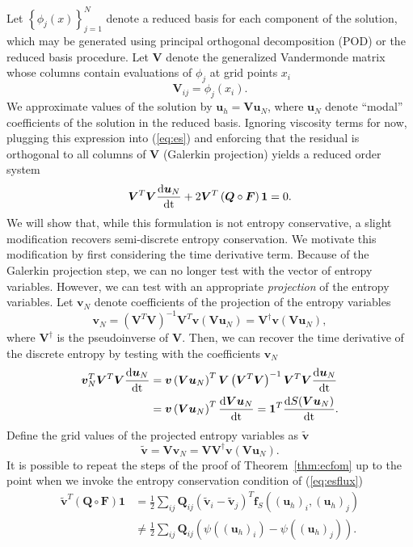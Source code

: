 \documentclass[review]{siamart171218}
\theoremstyle{assumption}
\renewcommand{\tilde}{\widetilde}
\newcommand{\td}[2]{\frac{{\rm d}#1}{{\rm d}{\rm #2}}}
\newcommand{\LRp}[1]{\left( #1 \right)}
\newcommand{\LRc}[1]{\left\{ #1 \right\}}
\begin{document}
Let $\LRc{{\phi}_j(x)}_{j=1}^{N}$ denote a reduced basis for each component of the solution, which may be generated using principal orthogonal decomposition (POD) or the reduced basis procedure.  Let $\bm{V}$ denote the generalized Vandermonde matrix whose columns contain evaluations of $\phi_j$ at grid points $x_i$
\[
\bm{V}_{ij} = {\phi}_j(x_i).
\]
We approximate values of the solution by $\bm{u}_h = \bm{V}\bm{u}_N$, where $\bm{u}_N$ denote ``modal'' coefficients  of the solution in the reduced basis.  Ignoring viscosity terms for now, plugging this expression into (\ref{eq:es}) and enforcing that the residual is orthogonal to all columns of $\bm{V}$ (Galerkin projection) yields a reduced order system
\begin{align*}
\bm{V}^T\bm{V}\td{\bm{u}_N}{t} + 2\bm{V}^T\LRp{\bm{Q}\circ \bm{F}}\bm{1} = 0.
\end{align*}
We will show that, while this formulation is not entropy conservative, a slight modification recovers semi-discrete entropy conservation.  We motivate this modification by first considering the time derivative term.  Because of the Galerkin projection step, we can no longer test with the vector of entropy variables.  However, we can test with an appropriate \textit{projection} of the entropy variables.  Let $\bm{v}_N$ denote coefficients of the projection of the entropy variables
\[
\bm{v}_N = \LRp{\bm{V}^T\bm{V}}^{-1}\bm{V}^T \bm{v}\LRp{\bm{V}\bm{u}_N} = \bm{V}^{\dagger} \bm{v}\LRp{\bm{V}\bm{u}_N},
\]
where $\bm{V}^{\dagger}$ is the pseudoinverse of $\bm{V}$.  Then, we can recover the time derivative of the discrete entropy by testing with the coefficients $\bm{v}_N$
\begin{align}
\bm{v}_N^T\bm{V}^T\bm{V}\td{\bm{u}_N}{t} &= \bm{v}\LRp{\bm{V}\bm{u}_N}^T \bm{V}\LRp{\bm{V}^T\bm{V}}^{-1}\bm{V}^T\bm{V} \td{\bm{u}_N}{t} \label{eq:esromtime}\\
&= 
 \bm{v}\LRp{\bm{V}\bm{u}_N}^T \td{\bm{V}\bm{u}_N}{t} = \bm{1}^T\td{S(\bm{V}\bm{u}_N)}{t}.\nonumber
\end{align}
Define the grid values of the projected entropy variables as $\tilde{\bm{v}}$ 
\[
\tilde{\bm{v}} = \bm{V}\bm{v}_N = \bm{V}\bm{V}^{\dagger} \bm{v}\LRp{\bm{V}\bm{u}_N}.
\]
It is possible to repeat the steps of the proof of Theorem~\ref{thm:ecfom} up to the point when we invoke the entropy conservation condition of (\ref{eq:esflux})
\begin{align*}
\tilde{\bm{v}}^T\LRp{{\bm{Q}}\circ \bm{F}}\bm{1} &= \frac{1}{2}\sum_{ij} \bm{Q}_{ij} \LRp{\tilde{\bm{v}}_i-\tilde{\bm{v}}_j}^T \bm{f}_{S}\LRp{\LRp{\bm{u}_h}_i, \LRp{\bm{u}_h}_j}\\
&\neq \frac{1}{2}\sum_{ij} \bm{Q}_{ij} \LRp{ \psi((\bm{u}_h)_i)- \psi((\bm{u}_h)_j)}.
\end{align*}
\end{document}
